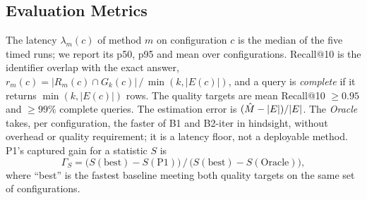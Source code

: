 \subsection{Evaluation Metrics}
\label{sec:metrics}
The latency $\lambda_m(c)$ of method $m$ on configuration $c$ is the median of the five timed runs; we report its p50,
p95 and mean over configurations. Recall@10 is the identifier overlap with the exact answer,
$r_m(c)=|R_m(c)\cap G_k(c)|\,/\,\min(k,|E(c)|)$, and a query is \emph{complete} if it returns $\min(k,|E(c)|)$ rows.
The quality targets are mean Recall@10 $\ge0.95$ and $\ge99\%$ complete queries. The estimation error is
$(\hat{M}-|E|)/|E|$. The \emph{Oracle} takes, per configuration, the faster of B1 and B2-iter in hindsight, without
overhead or quality requirement; it is a latency floor, not a deployable method. P1's captured gain for a statistic
$S$ is
\begin{equation}
\Gamma_S=\bigl(S(\text{best})-S(\text{P1})\bigr)\,/\,\bigl(S(\text{best})-S(\text{Oracle})\bigr),
\label{eq:gain}
\end{equation}
where ``best'' is the fastest baseline meeting both quality targets on the same set of configurations.
